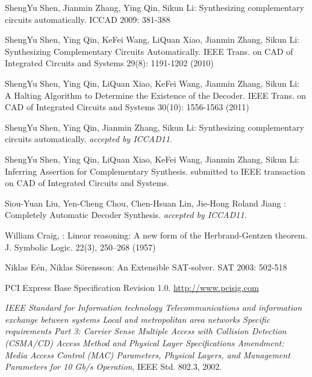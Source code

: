 \documentclass[runningheads,a4paper]{llncs}
\begin{document}

\begin{thebibliography}{4}

ShengYu Shen, Jianmin Zhang, Ying Qin, Sikun Li: Synthesizing complementary circuits automatically. ICCAD 2009: 381-388


ShengYu Shen, Ying Qin, KeFei Wang, LiQuan Xiao, Jianmin Zhang, Sikun Li: Synthesizing Complementary Circuits Automatically. IEEE Trans. on CAD of Integrated Circuits and Systems 29(8): 1191-1202 (2010)


ShengYu Shen, Ying Qin, LiQuan Xiao, KeFei Wang, Jianmin Zhang, Sikun Li: A Halting Algorithm to Determine the Existence of the Decoder. IEEE Trans. on CAD of Integrated Circuits and Systems 30(10): 1556-1563 (2011)


ShengYu Shen, Ying Qin, Jianmin Zhang, Sikun Li: Synthesizing complementary circuits automatically.
\emph{accepted by ICCAD11}.

ShengYu Shen, Ying Qin, LiQuan Xiao, KeFei Wang, Jianmin Zhang, Sikun Li: Inferring Assertion for Complementary Synthesis.
submitted to IEEE transaction on CAD of Integrated Circuits and Systems.

Siou-Yuan Liu,
Yen-Cheng Chou,
Chen-Hsuan Lin,
Jie-Hong Roland Jiang
:
Completely Automatic Decoder Synthesis.
\emph{accepted by ICCAD11}.




William Craig,
:
Linear reasoning: A new form of the Herbrand-Gentzen theorem.
J. Symbolic Logic. 22(3), 250--268 (1957)


Niklas E\'en, Niklas S\"orensson: An Extensible SAT-solver. SAT 2003: 502-518


PCI Express Base Specification Revision 1.0.
\url{http://www.pcisig.com}

\emph{IEEE Standard for Information technology Telecommunications and
  information exchange between systems Local and metropolitan area networks
  Specific requirements Part 3: Carrier Sense Multiple Access with Collision
  Detection (CSMA/CD) Access Method and Physical Layer Specifications
  Amendment: Media Access Control (MAC) Parameters, Physical Layers, and
  Management Parameters for 10 Gb/s Operation}, IEEE Std. 802.3, 2002.


\end{thebibliography}
\end{document}
